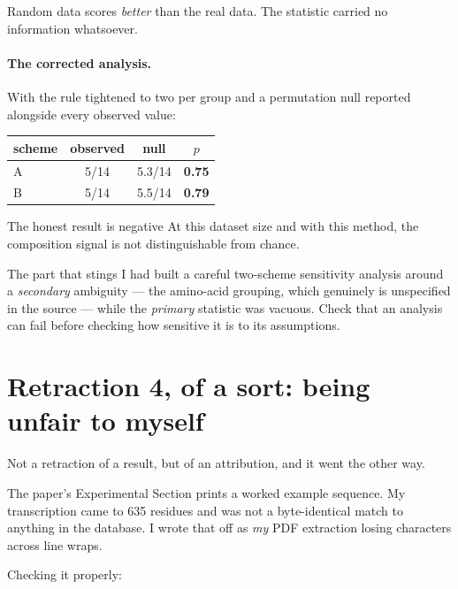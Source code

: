 Random data scores \emph{better} than the real data. The statistic carried no
information whatsoever.

\paragraph{The corrected analysis.} With the rule tightened to two per group and
a permutation null reported alongside every observed value:

\begin{center}
\small
\begin{tabular}{lccc}
\toprule
\textbf{scheme} & \textbf{observed} & \textbf{null} & \textbf{$p$} \\
\midrule
A & 5/14 & 5.3/14 & \textbf{0.75} \\
B & 5/14 & 5.5/14 & \textbf{0.79} \\
\bottomrule
\end{tabular}
\end{center}

\begin{goodbox}{The honest result is negative}
At this dataset size and with this method, the composition signal is not
distinguishable from chance.
\end{goodbox}

\begin{warnbox}{The part that stings}
I had built a careful two-scheme sensitivity analysis around a \emph{secondary}
ambiguity --- the amino-acid grouping, which genuinely is unspecified in the
source --- while the \emph{primary} statistic was vacuous. Check that an analysis
can fail before checking how sensitive it is to its assumptions.
\end{warnbox}

\section{Retraction 4, of a sort: being unfair to myself}
\label{sec:d8}

Not a retraction of a result, but of an attribution, and it went the other way.

The paper's Experimental Section prints a worked example sequence. My
transcription came to 635 residues and was not a byte-identical match to
anything in the database. I wrote that off as \emph{my} PDF extraction losing
characters across line wraps.

Checking it properly:

